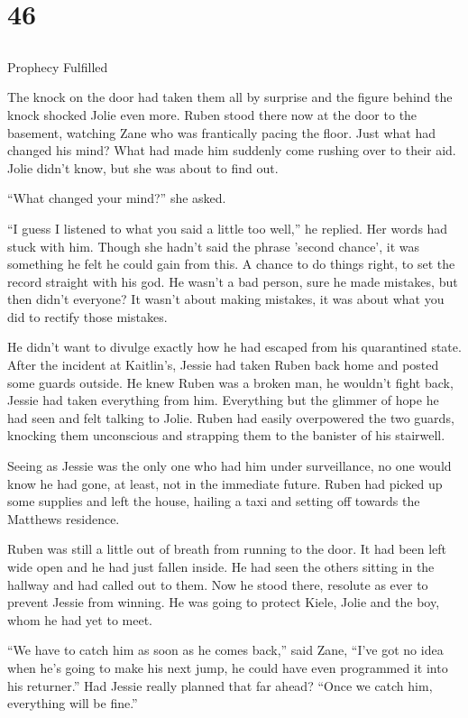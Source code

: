 \chapter{46}
\section{}
Prophecy Fulfilled  

The knock on the door had taken them all by surprise and the figure behind the knock shocked Jolie even more.  Ruben stood there now at the door to the basement, watching Zane who was frantically pacing the floor.  Just what had changed his mind?  What had made him suddenly come rushing over to their aid.  Jolie didn't know, but she was about to find out.

``What changed your mind?'' she asked.  

``I guess I listened to what you said a little too well,'' he replied.  Her words had stuck with him.  Though she hadn't said the phrase 'second chance', it was something he felt he could gain from this.  A chance to do things right, to set the record straight with his god.  He wasn't a bad person, sure he made mistakes, but then didn't everyone?  It wasn't about making mistakes, it was about what you did to rectify those mistakes.  

He didn't want to divulge exactly how he had escaped from his quarantined state.  After the incident at Kaitlin's, Jessie had taken Ruben back home and posted some guards outside.  He knew Ruben was a broken man, he wouldn't fight back, Jessie had taken everything from him.  Everything but the glimmer of hope he had seen and felt talking to Jolie.   Ruben had easily overpowered the two guards, knocking them unconscious and strapping them to the banister of his stairwell.  

Seeing as Jessie was the only one who had him under surveillance, no one would know he had gone, at least, not in the immediate future.  Ruben had picked up some supplies and left the house, hailing a taxi and setting off towards the Matthews residence.  

Ruben was still a little out of breath from running to the door.  It had been left wide open and he had just fallen inside.  He had seen the others sitting in the hallway and had called out to them.  Now he stood there, resolute as ever to prevent Jessie from winning.  He was going to protect Kiele, Jolie and the boy, whom he had yet to meet.

``We have to catch him as soon as he comes back,'' said Zane, ``I've got no idea when he's going to make his next jump, he could have even programmed it into his returner.''  Had Jessie really planned that far ahead?  ``Once we catch him, everything will be fine.''

